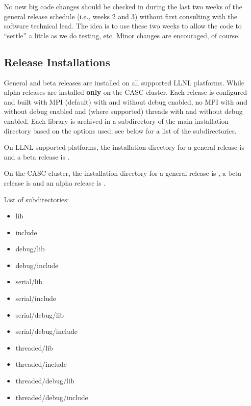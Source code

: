 No new big code changes should be checked in during the last two weeks
of the general release schedule (i.e., weeks 2 and 3) without first
consulting with the \hypre{} software technical lead.  The idea is to
use these two weeks to allow the code to ``settle'' a little as we do
testing, etc.  Minor changes are encouraged, of course.

\subsection{Release Installations}
\label{Release Installations}

General and beta releases are installed on all supported LLNL platforms. While
alpha releases are installed {\bf only} on the CASC cluster.  Each release is 
configured and built with MPI (default) with and without debug enabled, no MPI
with and without debug enabled and (where supported) threads with and without 
debug enabled. Each library is archived in a subdirectory of the main installation
directory based on the options used; see below for a list of the subdirectories.

\noindent
On LLNL supported platforms, the installation directory for a general
release is  and a beta release is . 

On the CASC cluster, the installation directory for a general release is
, a beta release is  and
an alpha release is .

List of subdirectories:
\begin{itemize}
\item lib
\item include
\item debug/lib
\item debug/include
\item serial/lib
\item serial/include
\item serial/debug/lib
\item serial/debug/include
\item threaded/lib
\item threaded/include
\item threaded/debug/lib
\item threaded/debug/include
\end{itemize}

